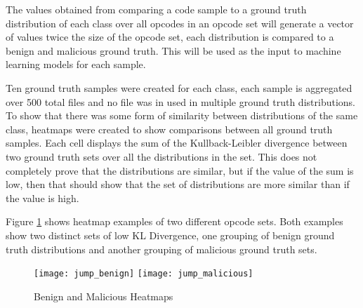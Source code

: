 The values obtained from comparing a code sample to a ground truth distribution of each class over all opcodes in
an opcode set will generate a vector of values twice the size of the opcode set, each distribution is compared to a
benign and malicious ground truth.
This will be used as the input to machine learning models for each sample.



Ten ground truth samples were created for each class, each sample is aggregated over 500 total files and no file was in
used in multiple ground truth distributions.
To show that there was some form of similarity between distributions of the same class, heatmaps were created to
show comparisons between all ground truth samples.
Each cell displays the sum of the Kullback-Leibler divergence between two ground truth sets over all the
distributions in the set.
This does not completely prove that the distributions are similar, but if the value of the sum is low, then that
should show that the set of distributions are more similar than if the value is high.

Figure \ref{fig:example_heatmaps} shows heatmap examples of two different opcode sets.
Both examples show two distinct sets of low KL Divergence, one grouping of benign ground truth distributions
and another grouping of malicious ground truth sets.

\begin{figure}[H]
    \centering
    \texttt{[image: jump\_benign]}\hspace{1em}%
    \texttt{[image: jump\_malicious]}
    \centering
    \caption{
        Benign and Malicious Heatmaps
    }
    \label{fig:example_heatmaps}
\end{figure}

